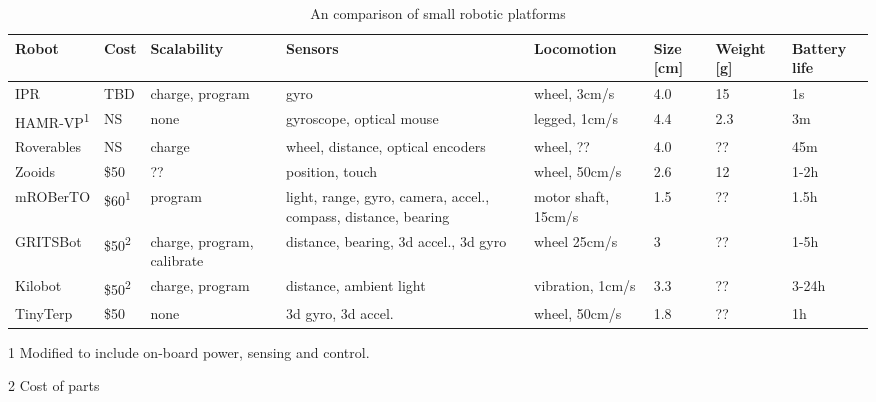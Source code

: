 


\begin{table*}[t]
	\centering
	\begin{threeparttable}
		\caption{An comparison of small robotic platforms}
		\label{tab:1}
 		\begin{tabularx}{500pt}{l l X X l l l l} 
			\hline
 			Robot & Cost & Scalability & Sensors & Locomotion & Size [cm] & Weight [g] & Battery life \\ 
 			\hline
 			IPR & TBD & charge, program & gyro & wheel, 3cm/s & 4.0 & 15 & 1s\\
 			HAMR-VP\textsuperscript{1} \cite{bruhwiler_iros_2015} & NS & none & gyroscope, optical mouse & legged, 1cm/s & 4.4 & 2.3 & 3m \\
 			Roverables \cite{dementyev_uist_2016} & NS & charge & wheel, distance, optical encoders & wheel, ?? & 4.0 & ?? & 45m \\ 
 			Zooids \cite{legoc_uist_2016} & \$50 & ?? & position, touch & wheel, 50cm/s & 2.6 & 12 & 1-2h \\ 
 			mROBerTO \cite{kim_iros_2016} & \$60\textsuperscript{1} & program & light, range, gyro, camera, accel., compass, distance, bearing & motor shaft, 15cm/s & 1.5 & ?? & 1.5h\\
 			GRITSBot \cite{pickem_icra_2015} & \$50\textsuperscript{2} & charge, program, calibrate & distance, bearing, 3d accel., 3d gyro & wheel 25cm/s & 3 & ?? & 1-5h \\
 			Kilobot \cite{rubenstein_icra_2012} & \$50\textsuperscript{2} & charge, program & distance, ambient light & vibration, 1cm/s & 3.3 & ?? & 3-24h\\
 			TinyTerp \cite{sabelhaus_icra_2013} & \$50 & none & 3d gyro, 3d accel. & wheel, 50cm/s & 1.8 & ?? & 1h\\
			\hline
		\end{tabularx}
		\begin{tablenotes}
			\item [1] Modified to include on-board power, sensing and control.
			\item [2] Cost of parts
		\end{tablenotes}
	\end{threeparttable}
\end{table*}